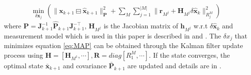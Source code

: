 \vspace{-3mm}\small
\begin{eqnarray}
\label{eq:MAP}
  \min\limits_{\delta\textbf{x}_j} ( \lVert \textbf{x}_{k+1} \boxminus \widehat{\textbf{x}}_{k+1} \rVert ^2_{\textbf{P}} + \sum_{M}\sum^{|M|}_{j=1} \lVert \textbf{r}_{M^j} +\textbf{H}_{M^j}\delta \widehat{\textbf{x}}_k \rVert ^{2}_{{R_j^M}} )
\end{eqnarray}
\normalsize
where $\textbf{P}={\textbf{J}_{k+1}^{-1}}\widehat{\textbf{P}}_{k+1}{\textbf{J}_{k+1}^{-\top}}$, $\textbf{H}_{M^j}$ is the Jacobian matrix of ${\textbf{h}}_{M^j}$ w.r.t $\delta \widehat{\textbf{x}}_{k}$ and measurement model which is used in this paper is described in  and . The $\delta x_j$ that minimizes equation \eqref{eq:MAP} can be obtained through the Kalman filter update process using $\mathbf{H}=\left[\mathbf{H}_{M^1},\cdots \right], \mathbf{R}=diag\left[{R}_1^M,\cdots\right]$. If the state converges, the optimal state $\bar{\textbf{x}}_{k+1}$ and covariance $\bar{\mathbf{P}}_{k+1}$ are updated and details are in \cite{he2021kalman}.


